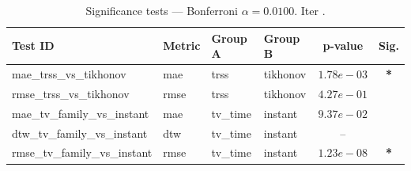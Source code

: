 ﻿%
\begin{table}[ht]
\centering
\caption[EEG reconstruction - Iteration it40]{Significance tests — Bonferroni $\alpha=0.0100$. Iter .}
\label{tab:sig_it40_3syn_all_mr_analysis}
\small
\begin{tabular}{llllcc}
\toprule
Test ID & Metric & Group A & Group B & p-value & Sig. \\
\midrule
mae\_trss\_vs\_tikhonov & mae & trss & tikhonov & $1.78e-03$ & \textbf{*} \\
rmse\_trss\_vs\_tikhonov & rmse & trss & tikhonov & $4.27e-01$ &  \\
mae\_tv\_family\_vs\_instant & mae & tv\_time & instant & $9.37e-02$ &  \\
dtw\_tv\_family\_vs\_instant & dtw & tv\_time & instant & -- &  \\
rmse\_tv\_family\_vs\_instant & rmse & tv\_time & instant & $1.23e-08$ & \textbf{*} \\
\bottomrule
\end{tabular}
\end{table}







